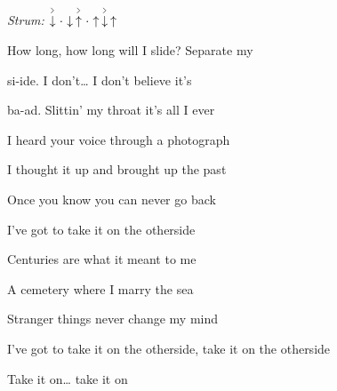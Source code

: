 \begin{song}


\begin{strumbox}
\textit{Strum:} $\AccentDown\Miss\Down\AccentUp\Miss\Up\AccentDown\Up$
\end{strumbox}

\begin{vchordbox}
\vspace{2em}
 \par
{} \par
{} \par
{} \par
{} \par
\end{vchordbox}

\large

\bigskip
 
\Intro {}     \par

\bigskip

\begin{chorusbox}{\Chorus}
 How long, how long will I slide? Separate my \par
{}si-ide. I don't… I don't believe it's \par
{}ba-ad. Slittin' my throat it's all I ever 
\end{chorusbox}

\bigskip

 I heard your voice through a photograph \par
{} I thought it up and brought up the past \par
{} Once you know you can never go back \par
I've got to take it on the otherside 

\bigskip

 Centuries are what it meant to me \par
{} A cemetery where I marry the sea \par
{} Stranger things never change my mind \par
I've got to take it on the otherside, take it on the otherside \par
{}Take it on… take it on


\end{song}
